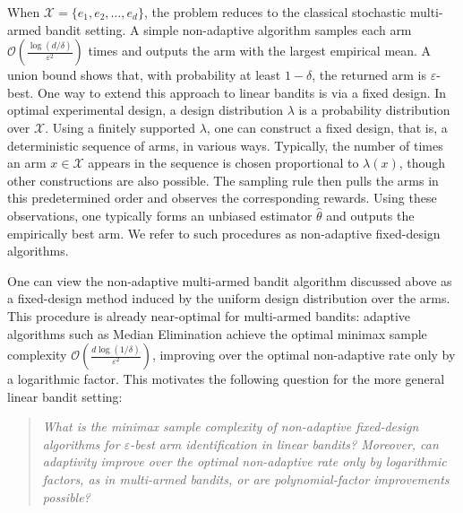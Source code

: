 When $\mathcal{X}=\{e_1,e_2,\ldots,e_d\}$, the problem reduces to the classical stochastic multi-armed bandit setting. A simple non-adaptive algorithm samples each arm $\mathcal{O}\!\left(\frac{\log(d/\delta)}{\varepsilon^2}\right)$ times and outputs the arm with the largest empirical mean. A union bound shows that, with probability at least $1-\delta$, the returned arm is $\varepsilon$-best. One way to extend this approach to linear bandits is via a fixed design. In optimal experimental design, a design distribution $\lambda$ is a probability distribution over $\mathcal{X}$. Using a finitely supported $\lambda$, one can construct a fixed design, that is, a deterministic sequence of arms, in various ways. Typically, the number of times an arm $x\in\mathcal{X}$ appears in the sequence is chosen proportional to $\lambda(x)$, though other constructions are also possible.
The sampling rule then pulls the arms in this predetermined order and observes the corresponding rewards. Using these observations, one typically forms an unbiased estimator $\widehat{\theta}$ and outputs the empirically best arm. We refer to such procedures as non-adaptive fixed-design algorithms.

One can view the non-adaptive multi-armed bandit algorithm discussed above as a fixed-design method induced by the uniform design distribution over the arms. This procedure is already near-optimal for multi-armed bandits: adaptive algorithms such as Median Elimination \citep{even2002pac} achieve the optimal minimax sample complexity $\mathcal{O}\!\left(\frac{d\log(1/\delta)}{\varepsilon^2}\right)$, improving over the optimal non-adaptive rate only by a logarithmic factor. This motivates the following question for the more general linear bandit setting:
\begin{quote}
\emph{What is the minimax sample complexity of non-adaptive fixed-design algorithms for $\varepsilon$-best arm identification in linear bandits? {Moreover, can adaptivity improve over the optimal non-adaptive rate only by logarithmic factors, as in multi-armed bandits, or are polynomial-factor improvements possible?}}
\end{quote}

